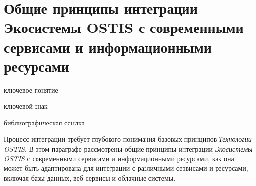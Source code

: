 \section{Общие принципы интеграции Экосистемы OSTIS с современными сервисами и информационными ресурсами}
{\label{sec_integration_common_principles}}

\begin{SCn}

    \bigskip
    \begin{scnrelfromlist}{ключевое понятие}
    \end{scnrelfromlist}

    \bigskip
    \begin{scnrelfromlist}{ключевой знак}
    \end{scnrelfromlist}
    
    \begin{scnrelfromlist}{библиографическая ссылка}
    \end{scnrelfromlist}
    
\end{SCn}

Процесс интеграции требует глубокого понимания базовых принципов \textit{Технологии OSTIS}. 
В этом параграфе рассмотрены общие принципы интеграции \textit{Экосистемы OSTIS} с современными сервисами и информационными ресурсами, как она может быть адаптирована для интеграции с различными сервисами и ресурсами, включая базы данных, веб-сервисы и облачные системы.

